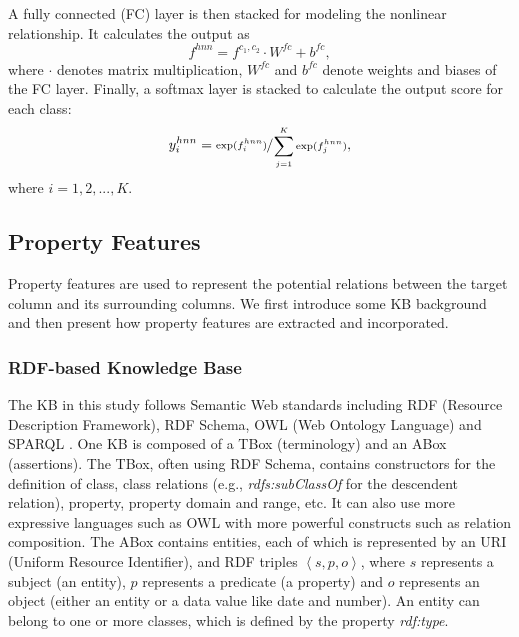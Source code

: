 \documentclass{article}
\begin{document}
A fully connected (FC) layer is then stacked for modeling the nonlinear relationship.
It calculates the output as
\vspace{-0.05cm}
\begin{equation}\label{eq:f_hnn}
f^{hnn} = f^{c_1,c_2} \cdot W^{fc} + b^{fc},    
\end{equation}
where $\cdot$ denotes matrix multiplication,  
$W^{fc}$ and $b^{fc}$ denote weights and biases of the FC layer.
Finally, a softmax layer is stacked to calculate the output score for each class:
\vspace{-0.15cm}
\begin{equation}\label{eq:y_hnn}
y_i^{hnn} = \sfrac{\text{exp}(f_i^{hnn})}{\sum_{j=1}^K \text{exp}(f_j^{hnn})},
\vspace{-0.25cm}
\end{equation}
where $i=1,2,...,K$.

\subsection{Property Features}
Property features are used to represent the potential relations between the target column and its surrounding columns.
We first introduce some KB background 
and then present how property features are extracted and incorporated.



\subsubsection{RDF-based Knowledge Base}
The KB in this study follows Semantic Web standards including RDF (Resource Description Framework), RDF Schema, OWL (Web Ontology Language) and SPARQL \cite{domingue2011handbook}.
One KB is composed of a TBox (terminology) and an ABox (assertions).
The TBox, often using RDF Schema, contains constructors for
the definition of class,
class relations (e.g., \textit{rdfs:subClassOf} for the descendent relation),
property,
property domain and range, etc.
It can also use more expressive languages such as OWL with 
more powerful constructs such as relation composition.
The ABox contains entities, each of which is represented by an URI (Uniform Resource Identifier),
and RDF triples 
$\left\langle s, p, o \right\rangle$,
where $s$ represents a subject (an entity), 
$p$ represents a predicate (a property) 
and $o$ represents an object
(either an entity or a data value like date and number).
An entity can belong to
one or more classes, which is defined by the property \textit{rdf:type}. 
\end{document}

